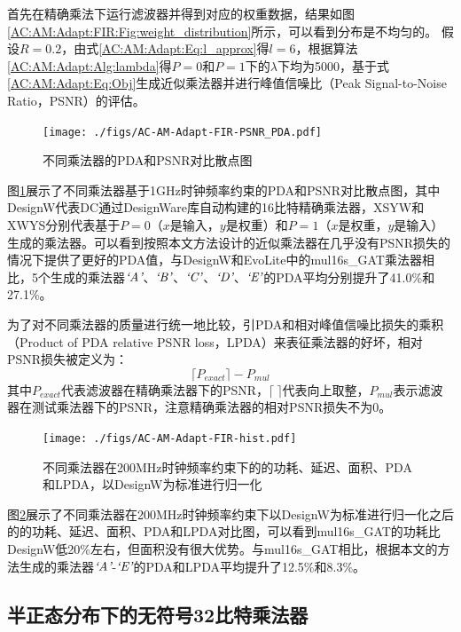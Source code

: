 首先在精确乘法下运行滤波器并得到对应的权重数据，结果如图\ref{AC:AM:Adapt:FIR:Fig:weight_distribution}所示，可以看到分布是不均匀的。
假设$R=0.2$，由式\ref{AC:AM:Adapt:Eq:l_approx}得$l=6$，根据算法\ref{AC:AM:Adapt:Alg:lambda}得$P=0$和$P=1$下的$\lambda$下均为5000，基于式\eqref{AC:AM:Adapt:Eq:Obj}生成近似乘法器并进行峰值信噪比（Peak Signal-to-Noise Ratio，PSNR）的评估。

\begin{figure}[!ht]
    \centering
    \texttt{[image: ./figs/AC-AM-Adapt-FIR-PSNR\_PDA.pdf]}
    \caption{不同乘法器的PDA和PSNR对比散点图}
    \label{AC:AM:Adapt:FIR:Fig:PSNR_PDA}
\end{figure}

图\ref{AC:AM:Adapt:FIR:Fig:PSNR_PDA}展示了不同乘法器基于1GHz时钟频率约束的PDA和PSNR对比散点图，其中DesignW代表DC通过DesignWare库\cite{IP:DesignWare}自动构建的16比特精确乘法器，XSYW和XWYS分别代表基于$P=0$（$x$是输入，$y$是权重）和$P=1$（$x$是权重，$y$是输入）生成的乘法器。可以看到按照本文方法设计的近似乘法器在几乎没有PSNR损失的情况下提供了更好的PDA值，与DesignW和EvoLite中的mul16s\_GAT乘法器相比，5个生成的乘法器$\emph{`A'}$、$\emph{`B'}$、$\emph{`C'}$、$\emph{`D'}$、$\emph{`E'}$的PDA平均分别提升了41.0\%和27.1\%。

为了对不同乘法器的质量进行统一地比较，引PDA和相对峰值信噪比损失的乘积（Product of PDA relative PSNR loss，LPDA）来表征乘法器的好坏，相对PSNR损失被定义为：
\begin{equation}
    \lceil P_{exact} \rceil - P_{mul}
\label{AC:AM:Adapt:FIR:Eq:R_PSNR_Loss}
\end{equation}
其中$P_{exact}$代表滤波器在精确乘法器下的PSNR，$\lceil \ \rceil$代表向上取整，$P_{mul}$表示滤波器在测试乘法器下的PSNR，注意精确乘法器的相对PSNR损失不为0。

\begin{figure}[!ht]
    \centering
    \texttt{[image: ./figs/AC-AM-Adapt-FIR-hist.pdf]}
    \caption{不同乘法器在200MHz时钟频率约束下的的功耗、延迟、面积、PDA和LPDA，以DesignW为标准进行归一化}
    \label{AC:AM:Adapt:FIR:Fig:hist}
\end{figure}

图\ref{AC:AM:Adapt:FIR:Fig:hist}展示了不同乘法器在200MHz时钟频率约束下以DesignW为标准进行归一化之后的的功耗、延迟、面积、PDA和LPDA对比图，可以看到mul16s\_GAT的功耗比DesignW低20\%左右，但面积没有很大优势。与mul16s\_GAT相比，根据本文的方法生成的乘法器$\emph{`A'}$-$\emph{`E'}$的PDA和LPDA平均提升了12.5\%和8.3\%。


\subsection{半正态分布下的无符号32比特乘法器}

